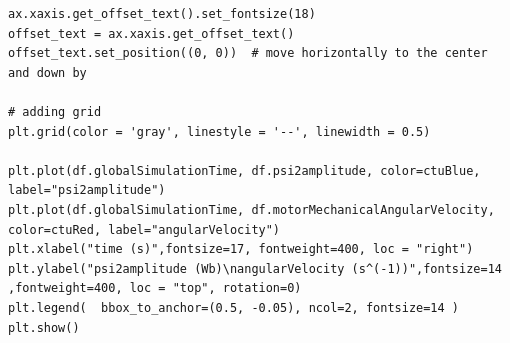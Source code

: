 \documentclass[a4paper, twoside, 11pt]{article}
\begin{document}
\begin{appendices}
\begin{lstlisting}
ax.xaxis.get_offset_text().set_fontsize(18)
offset_text = ax.xaxis.get_offset_text()
offset_text.set_position((0, 0))  # move horizontally to the center and down by 

# adding grid
plt.grid(color = 'gray', linestyle = '--', linewidth = 0.5)

plt.plot(df.globalSimulationTime, df.psi2amplitude, color=ctuBlue, label="psi2amplitude")
plt.plot(df.globalSimulationTime, df.motorMechanicalAngularVelocity, color=ctuRed, label="angularVelocity")
plt.xlabel("time (s)",fontsize=17, fontweight=400, loc = "right")
plt.ylabel("psi2amplitude (Wb)\nangularVelocity (s^(-1))",fontsize=14 ,fontweight=400, loc = "top", rotation=0)
plt.legend(  bbox_to_anchor=(0.5, -0.05), ncol=2, fontsize=14 )
plt.show()\end{lstlisting}

	\end{appendices}
\end{document}

